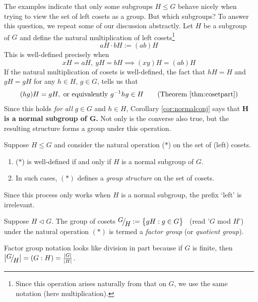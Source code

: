 



The examples indicate that only some subgroups $H\le G$ behave nicely when trying to view the set of left cosets as a group. But which subgroups? To answer this question, we repeat some of our discussion abstractly. Let $H$ be a subgroup of $G$ and define the natural multiplication of left cosets\footnote{Since this operation arises naturally from that on $G$, we use the same notation (here multiplication).}
\[
	aH\cdot bH:=(ab)H \tag{$\ast$}
\]
This is well-defined precisely when
\[
	xH=aH,\ yH=bH \implies (xy)H=(ab)H \tag{$\dag$}
\]
If the natural multiplication of cosets is well-defined, the fact that $hH=H$ and $gH=gH$ for any $h\in H$, $g\in G$, tells us that
\[
 	(hg)H=gH,\text{ or equivalently }	g^{-1}hg\in H \tag{Theorem \ref{thm:cosetpart}}
\]
Since this holds \emph{for all} $g\in G$ and $h\in H$, Corollary \ref{cor:normalconj} says that \textbf{$\boldsymbol{H}$ is a normal subgroup of $\boldsymbol G$.} Not only is the converse also true, but the resulting structure forms a group under this operation.

\begin{thm}{}{}
	Suppose $H\le G$ and consider the natural operation ($\ast$) on the set of (left) cosets.
	\begin{enumerate}
	  \item ($\ast$) is well-defined if and only if $H$ is a normal subgroup of $G$.
	  \item	In such cases, $(\ast)$ defines a \emph{group structure} on the set of cosets.
	\end{enumerate}
\end{thm}

Since this process only works when $H$ is a normal subgroup, the prefix `left' is irrelevant.

\begin{defn}{}{}
	Suppose $H\triangleleft G$. The group of cosets $\quotient GH:=\bigl\{gH:g\in G\bigr\}$ \ (read '$G$ mod $H$') under the natural operation $(\ast)$ is termed a \emph{factor group} (or \emph{quotient group}).
\end{defn}

Factor group notation looks like division in part because if $G$ is finite, then $\nm{\quotient GH}=(G:H)=\frac{\nm G}{\nm H}$.

